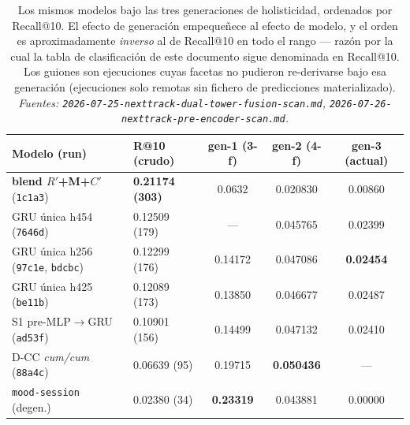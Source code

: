 \documentclass[11pt]{article}
\newcommand{\best}[1]{\textbf{#1}}
\newcommand{\Rp}{\ensuremath{R'}}
\newcommand{\Cp}{\ensuremath{C'}}
\begin{document}
\begin{table}[ht]
  \centering
  \caption{Los mismos modelos bajo las tres generaciones de holisticidad,
  ordenados por Recall@10. El efecto de generación empequeñece al efecto de
  modelo, y el orden es aproximadamente \emph{inverso} al de Recall@10 en todo el
  rango --- razón por la cual la tabla de clasificación de este documento sigue
  denominada en Recall@10. Los guiones son ejecuciones cuyas facetas no pudieron
  re-derivarse bajo esa generación (ejecuciones solo remotas sin fichero de
  predicciones materializado). \emph{Fuentes:
  \texttt{2026-07-25-nexttrack-dual-tower-fusion-scan.md},
  \texttt{2026-07-26-nexttrack-pre-encoder-scan.md}.}}
  \label{tab:hgen}
  {\footnotesize\setlength{\tabcolsep}{2.4pt}\begin{tabular}{llccc}
    \toprule
    Modelo (run) & R@10 (crudo) & gen-1 (3-f) & gen-2 (4-f) & gen-3 (actual) \\
    \midrule
    \best{blend \Rp+M+\Cp} (\texttt{1c1a3}) & \best{0.21174 (303)} & 0.0632 & 0.020830 & 0.00860 \\
    GRU única h454 (\texttt{7646d}) & 0.12509 (179) & --- & 0.045765 & 0.02399 \\
    GRU única h256 (\texttt{97c1e}, \texttt{bdcbc}) & 0.12299 (176) & 0.14172 & 0.047086 & \best{0.02454} \\
    GRU única h425 (\texttt{be11b}) & 0.12089 (173) & 0.13850 & 0.046677 & 0.02487 \\
    S1 pre-MLP$\to$GRU (\texttt{ad53f}) & 0.10901 (156) & 0.14499 & 0.047132 & 0.02410 \\
    D-CC \emph{cum/cum} (\texttt{88a4c}) & 0.06639 (95) & 0.19715 & \best{0.050436} & --- \\
    \texttt{mood-session} (degen.) & 0.02380 (34) & \best{0.23319} & 0.043881 & 0.00000 \\
    \bottomrule
  \end{tabular}}
\end{table}
\end{document}
